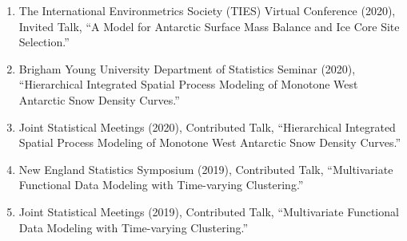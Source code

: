 \documentclass[12pt]{article}
\begin{document}
\begin{enumerate}[label=$\bullet$]
\item The International Environmetrics Society (TIES) Virtual Conference (2020), Invited Talk, ``A Model for Antarctic Surface Mass Balance and Ice Core Site Selection.''
\item Brigham Young University Department of Statistics Seminar (2020), ``Hierarchical Integrated Spatial Process Modeling of Monotone West Antarctic Snow Density Curves.''
\item Joint Statistical Meetings (2020), Contributed Talk, ``Hierarchical Integrated Spatial Process Modeling of Monotone West Antarctic Snow Density Curves.''

\item New England Statistics Symposium (2019), Contributed Talk, ``Multivariate Functional Data Modeling with Time-varying Clustering.''
\item Joint Statistical Meetings (2019), Contributed Talk, ``Multivariate Functional Data Modeling with Time-varying Clustering.''


\end{enumerate}
\end{document}
